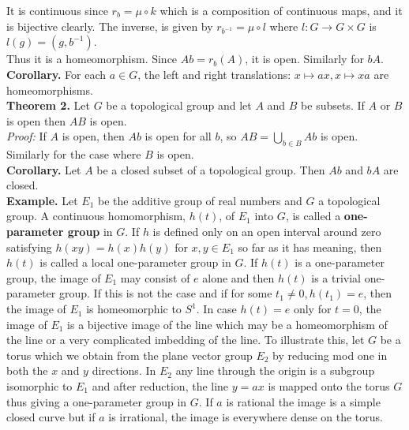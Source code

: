 \documentclass[a4paper]{article}
\theoremstyle{plain}%
\theoremstyle{definition}
\theoremstyle{remark}
\begin{document}
It is continuous since $r_b = \mu \circ k$ which is a composition of continuous
maps, and 
it is bijective clearly. The inverse, is given by
$r_{b^{-1}} = \mu \circ l$ where $l  \colon G \to G \times G$ is
$l (g) = \left( g, b^{-1} \right) $.\\
\linebreak
Thus it is a homeomorphism. Since
$Ab = r_b (A)$, it is open. Similarly for  $bA$.\\
\linebreak
\textbf{Corollary.} For each $a \in G$, the left and right translations:
$x \mapsto ax, x\mapsto xa$ are homeomorphisms.\\
\linebreak
\textbf{Theorem 2.} Let $G$ be a topological group and let
$A$ and $B$ be subsets. If $A$ or $B$ is open then $AB$ is open.\\
\linebreak
\textit{Proof:} If $A$ is open, then
$Ab$ is open for all $b$, so
$AB = \bigcup_{b \in B} Ab$ is open. Similarly for the case where $B$ is
open.\\
\linebreak
\textbf{Corollary.} Let $A$ be a closed subset of a topological group. Then
$Ab$ and $bA$ are closed.\\
\linebreak
\textbf{Example.} Let $E_1$ be the additive group of real numbers and $G$
a topological group. A continuous homomorphism, $h(t)$, of
$E_1$ into $G$, is called a \textbf{one-parameter group} in $G$. If
$h$ is defined only on an open interval around zero satisfying
$h(xy) = h(x) h(y)$ for $x,y \in E_1$ so far as it has meaning, then
$h(t)$ is called a local one-parameter group in $G$. If
$h(t)$ is a one-parameter group, the image of $E_1$ may consist of $e$ alone
and then $h(t)$ is a trivial one-parameter group. If this is not the case and
if for some $t_1 \neq 0, h(t_1) = e$, then the image of $E_1$ is homeomorphic
to  $S^{1}$. In case $h(t) = e$ only for $t=0$, the image of
$E_1$ is a bijective image of the line which may be a homeomorphism of the line
or a very complicated imbedding of the line. 
To illustrate this, let $G$ be a torus which we obtain from
the plane vector group $E_2$ by reducing mod one in both the $x$ and $y$
directions. In $E_2$ any line through the origin is a subgroup isomorphic to
$E_1$ and after reduction, the line $y = ax$ is mapped onto the torus $G$ thus
giving a one-parameter group in $G$. If $a$ is rational the image is a simple
closed curve but if $a$ is irrational, the image is everywhere dense on the
torus.
\end{document}
